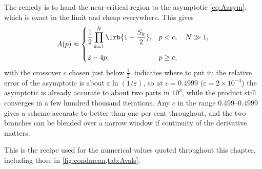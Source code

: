 The remedy is to hand the near-critical region to the asymptotic \cref{eq:Aasym}, which
is exact in the limit and cheap everywhere. This gives
\begin{equation}
\label{eq:Apractical}
A(p) \approx
\begin{cases}
\displaystyle \frac12\prod_{k=1}^{N}\lrb{1-\frac{S_k}{2}}, & p<c,\quad N\gg1,\\[14pt]
2-4p, & p\ge c,
\end{cases}
\end{equation}
with the crossover $c$ chosen just below $\tfrac12$.  indicates where to
put it: the relative error of the asymptotic is about $\varepsilon\ln(1/\varepsilon)$, so
at $c = 0.4999$ ($\varepsilon = 2\times10^{-4}$) the asymptotic is already accurate to
about two parts in $10^3$, while the product still converges in a few hundred thousand
iterations. Any $c$ in the range $0.499$--$0.4999$ gives a scheme accurate to better than
one per cent throughout, and the two branches can be blended over a narrow window if
continuity of the derivative matters.

This is the recipe used for the numerical values quoted throughout this chapter,
including those in \cref{fig:condmean,tab:Avals}.

\FloatBarrier
